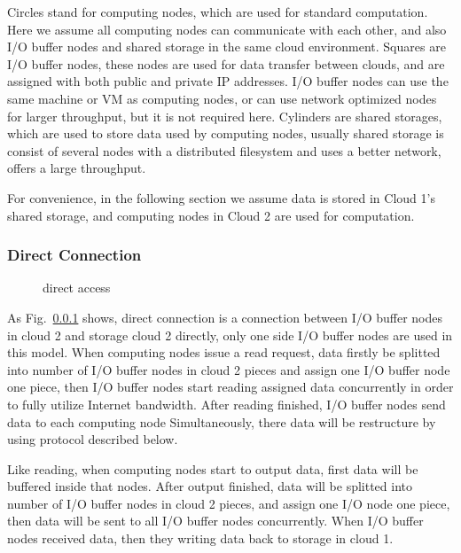 \documentclass[JIP,draft]{ipsj}
\begin{document}
Circles stand for computing nodes, which are used for standard computation.
Here we assume all computing nodes can communicate with each other, and also I/O buffer nodes and shared storage in the same cloud environment.
Squares are I/O buffer nodes, these nodes are used for data transfer between clouds, and are assigned with both public and private IP addresses.
I/O buffer nodes can use the same machine or VM as computing nodes, or can use network optimized nodes for larger throughput, but it is not required here.
Cylinders are shared storages, which are used to store data used by computing nodes, usually shared storage is consist of several nodes with a distributed filesystem and uses a better network, offers a large throughput.


For convenience, in the following section we assume data is stored in Cloud 1's shared storage, and computing nodes in Cloud 2 are used for computation. 

\subsubsection{Direct Connection}

\begin{figure}[tb]
	\centering
	\caption{direct access}
	\label{direct access}
\end{figure}

As Fig.~\ref{} shows, direct connection is a connection between I/O buffer nodes in cloud 2 and storage cloud 2 directly, only one side I/O buffer nodes are used in this model.
When computing nodes issue a read request, data firstly be splitted into number of I/O buffer nodes in cloud 2 pieces and assign one I/O buffer node one piece, then I/O buffer nodes start reading assigned data concurrently in order to fully utilize Internet bandwidth.
After reading finished, I/O buffer nodes send data to each computing node Simultaneously, there data will be restructure by using protocol described below.

Like reading, when computing nodes start to output data, first data will be buffered inside that nodes.
After output finished, data will be splitted into number of I/O buffer nodes in cloud 2 pieces, and assign one I/O node one piece, then data will be sent to all I/O buffer nodes concurrently.
When I/O buffer nodes received data, then they writing data back to storage in cloud 1.
\end{document}
